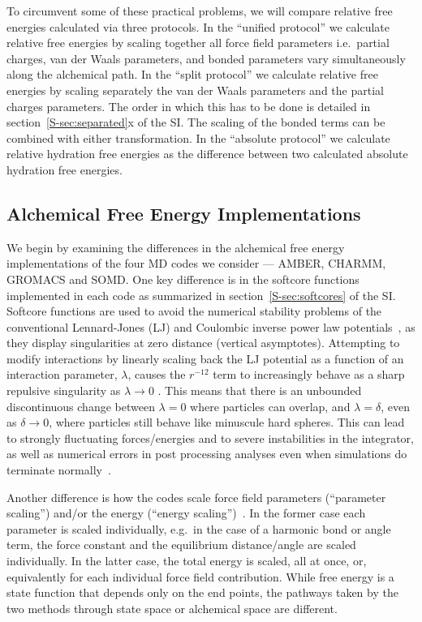 \documentclass[journal=jctcce,manuscript=article]{achemso}
\begin{document}
To circumvent some of these practical problems, we will compare
relative free energies calculated via three protocols.  In the
``unified protocol'' we calculate relative free energies by scaling
together all force field parameters i.e.\ partial charges, van der
Waals parameters, and bonded parameters vary simultaneously along the
alchemical path.  In the ``split protocol'' we calculate relative free
energies by scaling separately the van der Waals parameters and the
partial charges parameters.  The order in which this has to be done is
detailed in section~\ref{S-sec:separated}x of the SI.  The scaling of
the bonded terms can be combined with either transformation.  In the
``absolute protocol'' we calculate relative hydration free energies as
the difference between two calculated absolute hydration free energies.

\subsection{Alchemical Free Energy Implementations}
\label{sec:afe_impl}

We begin by examining the differences in the alchemical free energy
implementations of the four MD codes we consider --- AMBER, CHARMM, GROMACS and
SOMD.  One key difference is in the softcore
functions implemented in each code as summarized in section~\ref{S-sec:softcores} of the
SI. ~\cite{beutler_avoiding_1994,zacharias_separationshifted_1994} Softcore functions are used to avoid the numerical
stability problems of the conventional Lennard-Jones (LJ) and Coulombic inverse power law
potentials~\cite{ISI:A1993MB07100015,steinbrecher_nonlinear_2007}, as they display singularities at
zero distance (vertical asymptotes).  Attempting to modify interactions by
linearly scaling back the LJ potential as a function of an
interaction parameter, $\lambda$, causes the $r^{-12}$ term to increasingly behave
as a sharp repulsive singularity as $\lambda\rightarrow 0$ \cite{ISI:A1993MB07100015}.  This means that there
is an unbounded discontinuous change between $\lambda = 0$ where particles can overlap,
and $\lambda = \delta$, even as $\delta \rightarrow 0$, where particles still
behave like minuscule hard spheres.  This can lead to strongly
fluctuating forces/energies and to severe instabilities in the integrator, as
well as numerical errors in post processing analyses even when simulations do
terminate normally~\cite{beutler_avoiding_1994,
zacharias_separationshifted_1994, steinbrecher_nonlinear_2007}.

Another difference is how the codes scale force field parameters (``parameter
scaling'') and/or the energy (``energy
scaling'')~\cite{doi:10.1021/jp981628n}.  In the former case each parameter is
scaled individually, e.g.\ in the case of a harmonic bond or angle term,
the force constant and the equilibrium distance/angle are scaled
individually.  In the
latter case, the total energy is scaled, all at once, or, equivalently for each
individual force field contribution.  While free energy is a state function that
depends only on the end points, the pathways taken by the
two methods through state space or alchemical space are different.
\end{document}
